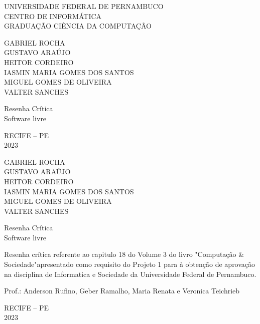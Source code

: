 \documentclass[a4paper, 12pt]{article}
\begin{document}
\thispagestyle{empty}

\begin{center}
    UNIVERSIDADE FEDERAL DE PERNAMBUCO \\
    CENTRO DE INFORMÁTICA \\
    GRADUAÇÃO CIÊNCIA DA COMPUTAÇÃO

    \vspace{3cm}

    GABRIEL ROCHA \\
    GUSTAVO ARAÚJO  \\
    HEITOR CORDEIRO \\
    IASMIN MARIA GOMES DOS SANTOS \\
    MIGUEL GOMES DE OLIVEIRA\\
    VALTER SANCHES 

    \vspace{4cm}

    Resenha Crítica \\
    Software livre

    
    \vfill

    RECIFE -- PE \\
    2023
\end{center}

\newpage
\thispagestyle{empty}
\begin{center}
    GABRIEL ROCHA \\
    GUSTAVO ARAÚJO  \\
    HEITOR CORDEIRO \\
    IASMIN MARIA GOMES DOS SANTOS \\
    MIGUEL GOMES DE OLIVEIRA\\
    VALTER SANCHES 

    \vspace{6cm}

    Resenha Crítica\\
    Software livre

    \vspace{2cm}

    \hspace*{0.5\textwidth} %
    \begin{minipage}{0.5\textwidth} %
        \justifying %
        Resenha crítica referente ao capitulo 18 do Volume 3 do livro "Computação \& Sociedade"\space  apresentado como requisito do Projeto 1 para à obtenção de aprovação na disciplina de Informatica e Sociedade da Universidade Federal de Pernambuco.

        \vspace{1\baselineskip}
        Prof.: Anderson Rufino, Geber Ramalho, Maria Renata e Veronica Teichrieb
    \end{minipage}

    \vfill

    RECIFE -- PE \\
    2023
\end{center}
\end{document}

